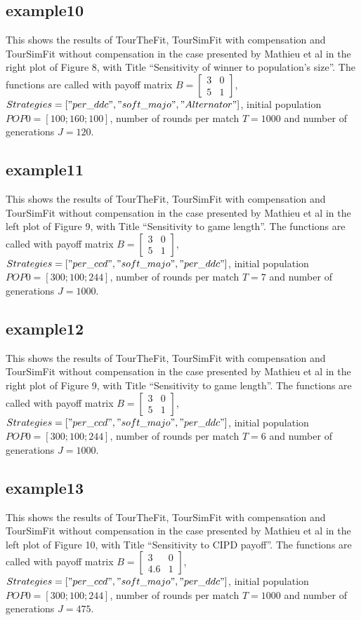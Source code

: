 \subsection{example10}
This shows the results of TourTheFit, TourSimFit with compensation and TourSimFit without compensation in the case presented by Mathieu et al in the right plot of Figure 8, with Title ``Sensitivity of winner to population's size''. The functions are called with payoff matrix $B = \begin{bmatrix} 3 & 0 \\ 5 & 1 \end{bmatrix}$, $Strategies = ["per\_ddc", "soft\_majo", "Alternator"]$, initial population $POP0 = [100; 160; 100]$, number of rounds per match $T = 1000$ and number of generations $J = 120$.

\subsection{example11}
This shows the results of TourTheFit, TourSimFit with compensation and TourSimFit without compensation in the case presented by Mathieu et al in the left plot of Figure 9, with Title ``Sensitivity to game length''. The functions are called with payoff matrix $B = \begin{bmatrix} 3 & 0 \\ 5 & 1 \end{bmatrix}$, $Strategies = ["per\_ccd", "soft\_majo", "per\_ddc"]$, initial population $POP0 = [300; 100; 244]$, number of rounds per match $T = 7$ and number of generations $J = 1000$.

\subsection{example12}
This shows the results of TourTheFit, TourSimFit with compensation and TourSimFit without compensation in the case presented by Mathieu et al in the right plot of Figure 9, with Title ``Sensitivity to game length''. The functions are called with payoff matrix $B = \begin{bmatrix} 3 & 0 \\ 5 & 1 \end{bmatrix}$, $Strategies = ["per\_ccd", "soft\_majo", "per\_ddc"]$, initial population $POP0 = [300; 100; 244]$, number of rounds per match $T = 6$ and number of generations $J = 1000$.

\subsection{example13}
This shows the results of TourTheFit, TourSimFit with compensation and TourSimFit without compensation in the case presented by Mathieu et al in the left plot of Figure 10, with Title ``Sensitivity to CIPD payoff''. The functions are called with payoff matrix $B = \begin{bmatrix} 3 & 0 \\ 4.6 & 1 \end{bmatrix}$, $Strategies = ["per\_ccd", "soft\_majo", "per\_ddc"]$, initial population $POP0 = [300; 100; 244]$, number of rounds per match $T = 1000$ and number of generations $J = 475$.

